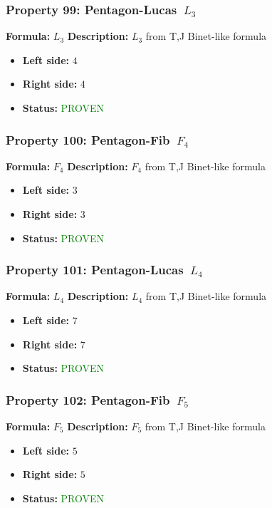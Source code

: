 \subsubsection*{Property 99: Pentagon-Lucas~$L_{3}$}
\textbf{Formula:} $L_3$
\textbf{Description:} $L_{3}$ from T,J Binet-like formula

\begin{itemize}
\item \textbf{Left side:} $4$
\item \textbf{Right side:} $4$
\item \textbf{Status:} \textcolor{green}{PROVEN}
\end{itemize}

\subsubsection*{Property 100: Pentagon-Fib~$F_{4}$}
\textbf{Formula:} $F_4$
\textbf{Description:} $F_{4}$ from T,J Binet-like formula

\begin{itemize}
\item \textbf{Left side:} $3$
\item \textbf{Right side:} $3$
\item \textbf{Status:} \textcolor{green}{PROVEN}
\end{itemize}

\subsubsection*{Property 101: Pentagon-Lucas~$L_{4}$}
\textbf{Formula:} $L_4$
\textbf{Description:} $L_{4}$ from T,J Binet-like formula

\begin{itemize}
\item \textbf{Left side:} $7$
\item \textbf{Right side:} $7$
\item \textbf{Status:} \textcolor{green}{PROVEN}
\end{itemize}

\subsubsection*{Property 102: Pentagon-Fib~$F_{5}$}
\textbf{Formula:} $F_5$
\textbf{Description:} $F_{5}$ from T,J Binet-like formula

\begin{itemize}
\item \textbf{Left side:} $5$
\item \textbf{Right side:} $5$
\item \textbf{Status:} \textcolor{green}{PROVEN}
\end{itemize}

